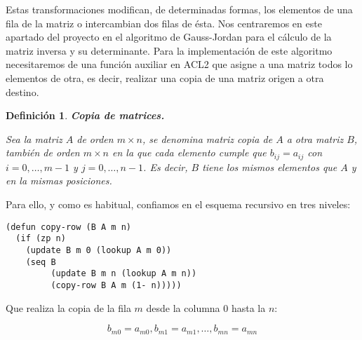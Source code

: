 \documentclass[a4paper,10pt]{article}
\newtheorem{defi}{{Definición}}
\begin{document}
\par \vspace{10pt}

Estas transformaciones modifican, de determinadas formas, los elementos de una fila de la matriz o intercambian dos filas de ésta. Nos centraremos en este apartado del proyecto en el algoritmo de Gauss-Jordan para el cálculo de la matriz inversa y su determinante. Para la implementación de este algoritmo necesitaremos de una función auxiliar en ACL2 que asigne a una matriz todos lo elementos de otra, es decir, realizar una copia de una matriz origen a otra destino.

\par \vspace{12pt}	

\begin{defi} \textbf{Copia de matrices.}\vspace{8pt}\par
Sea la matriz $A$ de orden $m \times n$, se denomina \emph{matriz copia} de $A$ a otra matriz $B$, también de orden $m \times n$ en la que cada elemento cumple que $b_{ij} = a_{ij}$ con $i = 0, \dots , m-1$ y $j= 0, \dots , n-1$. Es decir, $B$ tiene los mismos elementos que $A$ y en la mismas posiciones.
\end{defi}

\par \vspace{10pt}	

Para ello, y como es habitual, confiamos en el esquema recursivo en tres niveles:

\par \vspace{10pt}	

\begin{lstlisting}[language=clips]
(defun copy-row (B A m n)
  (if (zp n)
    (update B m 0 (lookup A m 0))
    (seq B
         (update B m n (lookup A m n))
         (copy-row B A m (1- n)))))
\end{lstlisting}

\par \vspace{10pt}	

Que realiza la copia de la fila $m$ desde la columna 0 hasta la $n$:

\par \vspace{10pt}	

$$
b_{m0} = a_{m0},b_{m1} = a_{m1},\dots,b_{mn} = a_{mn}
$$

\par \vspace{10pt}
\end{document}
